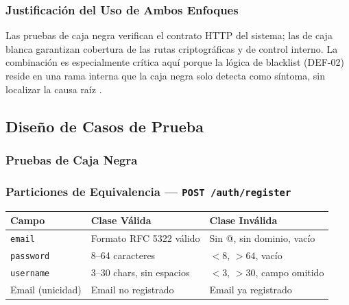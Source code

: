 \documentclass[11pt,a4paper]{article}
\begin{document}
\subsubsection{Justificación del Uso de Ambos Enfoques}

Las pruebas de caja negra verifican el contrato HTTP del sistema; las de caja blanca garantizan cobertura de las rutas criptográficas y de control interno. La combinación es especialmente crítica aquí porque la lógica de blacklist (DEF-02) reside en una rama interna que la caja negra solo detecta como síntoma, sin localizar la causa raíz \cite{pressman2014software}.

\subsection{Diseño de Casos de Prueba}

\subsubsection{Pruebas de Caja Negra}

\subsubsection{Particiones de Equivalencia — \texttt{POST /auth/register}}

\begin{center}
\begin{tabular}{|p{2.5cm}|p{5cm}|p{5cm}|}
\hline
\rowcolor{headerblue}\color{white}\textbf{Campo} & \color{white}\textbf{Clase Válida} & \color{white}\textbf{Clase Inválida} \\
\hline
\texttt{email} & Formato RFC 5322 válido & Sin @, sin dominio, vacío \\
\hline
\rowcolor{rowgray}
\texttt{password} & 8--64 caracteres & $<8$, $>64$, vacío \\
\hline
\texttt{username} & 3--30 chars, sin espacios & $<3$, $>30$, campo omitido \\
\hline
\rowcolor{rowgray}
Email (unicidad) & Email no registrado & Email ya registrado \\
\hline
\end{tabular}
\end{center}
\end{document}
